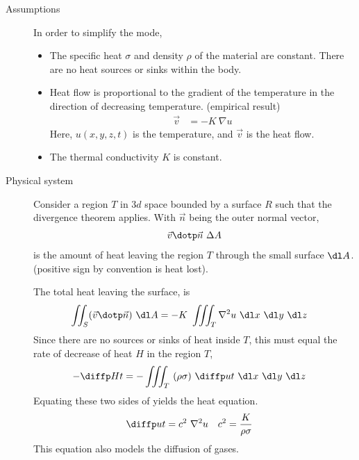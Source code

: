 \begin{description}
    \item[Assumptions] In order to simplify the mode,
        \begin{itemize}
            \item The specific heat $ \sigma $ and density $ \rho $ of the material are
                  constant. There are no heat sources or sinks within the body.
            \item Heat flow is proportional to the gradient of the temperature in the
                  direction of decreasing temperature. (empirical result)
                  \begin{align}
                      \vec{v} & = -K\ \nabla u
                  \end{align}
                  Here, $ u(x, y, z, t) $ is the temperature, and $\vec{v} $ is the
                  heat flow.
            \item The thermal conductivity $ K $ is constant.
        \end{itemize}

    \item[Physical system] Consider a region $ T $ in $ 3d $ space bounded by a surface
        $ R $ such that the divergence theorem applies. With $ \vec{n} $ being the outer
        normal vector,
        \begin{align}
            \vec{v} \dotp \vec{n}\ \Delta A
        \end{align}
        is the amount of heat leaving the region $ T $ through the small surface
        $ \dl A $. (positive sign by convention is heat lost). \par
        The total heat leaving the surface, is
        \begin{align}
            \iint_S (\vec{v} \dotp \vec{n})\ \dl A & =
            -K\ \iiint_T \nabla^2 u\ \dl x\ \dl y\ \dl z
        \end{align}
        Since there are no sources or sinks of heat inside $ T $, this must equal the
        rate of decrease of heat $ H $ in the region $ T $,
        \begin{align}
            -\diffp Ht & = - \iiint_T\ (\rho \sigma)\ \diffp ut\ \dl x\ \dl y\ \dl z
        \end{align}
        Equating these two sides of yields the heat equation.
        \begin{align}
            \diffp ut & = c^2\ \nabla^2 u       &
            c^2       & = \frac{K}{\rho \sigma}
        \end{align}
        This equation also models the diffusion of gases.
\end{description}

